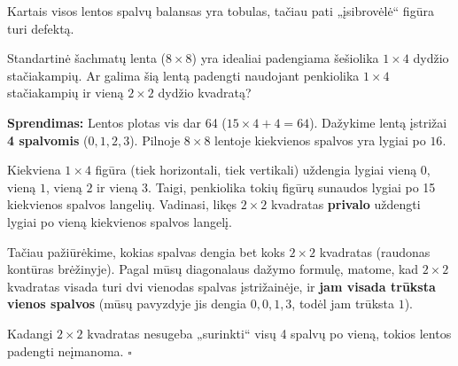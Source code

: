 \documentclass[11pt,a4paper]{scrartcl}
\newenvironment{solution}
    {\begin{list}{}{\setlength{\leftmargin}{10pt}\setlength{\rightmargin}{10pt}}\item[]}
    {\end{list}}
\begin{document}
Kartais visos lentos spalvų balansas yra tobulas, tačiau pati „įsibrovėlė“ figūra turi defektą.

\begin{example}
Standartinė šachmatų lenta ($8 \times 8$) yra idealiai padengiama šešiolika $1 \times 4$ dydžio stačiakampių. Ar galima šią lentą padengti naudojant penkiolika $1 \times 4$ stačiakampių ir vieną $2 \times 2$ dydžio kvadratą?
\end{example}

\begin{solution}
\textbf{Sprendimas:}
Lentos plotas vis dar 64 ($15 \times 4 + 4 = 64$). Dažykime lentą įstrižai \textbf{4 spalvomis} ($0, 1, 2, 3$). Pilnoje $8 \times 8$ lentoje kiekvienos spalvos yra lygiai po $16$.

\begin{center}
\end{center}

Kiekviena $1 \times 4$ figūra (tiek horizontali, tiek vertikali) uždengia lygiai vieną $0$, vieną $1$, vieną $2$ ir vieną $3$. Taigi, penkiolika tokių figūrų sunaudos lygiai po 15 kiekvienos spalvos langelių. Vadinasi, likęs $2 \times 2$ kvadratas \textbf{privalo} uždengti lygiai po vieną kiekvienos spalvos langelį.

Tačiau pažiūrėkime, kokias spalvas dengia bet koks $2 \times 2$ kvadratas (raudonas kontūras brėžinyje). Pagal mūsų diagonalaus dažymo formulę, matome, kad $2 \times 2$ kvadratas visada turi dvi vienodas spalvas įstrižainėje, ir \textbf{jam visada trūksta vienos spalvos} (mūsų pavyzdyje jis dengia $0, 0, 1, 3$, todėl jam trūksta $1$). 

Kadangi $2 \times 2$ kvadratas nesugeba „surinkti“ visų 4 spalvų po vieną, tokios lentos padengti neįmanoma. \hfill $\square$
\end{solution}
\end{document}
